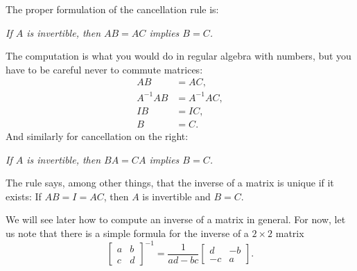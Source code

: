The proper formulation of the cancellation rule is:
\begin{center}
\emph{If $A$ is invertible,
then
$AB = AC$ implies $B=C$.}
\end{center}
The computation is what you would do in regular algebra with numbers,
but you have to
be careful never to commute matrices:
\begin{align*}
AB & = AC , \\
A^{-1}AB & = A^{-1}AC , \\
IB & = IC , \\
B & = C .
\end{align*}
And similarly for cancellation on the right:
\begin{center}
\emph{If $A$ is invertible,
then $BA = CA$ implies $B=C$.}
\end{center}

The rule says, among other things, that the
inverse of a matrix is unique if it exists:  If $AB = I = AC$, then $A$ is
invertible and $B=C$.

We will see later how to compute an inverse of a matrix
in general.  For now,
let us note that there is a simple formula for the inverse of
a $2 \times 2$ matrix
\begin{equation*}
\begin{bmatrix}
a & b \\
c & d
\end{bmatrix}^{-1}
=
\frac{1}{ad-bc}
\begin{bmatrix}
d & -b \\
-c & a
\end{bmatrix} .
\end{equation*}


